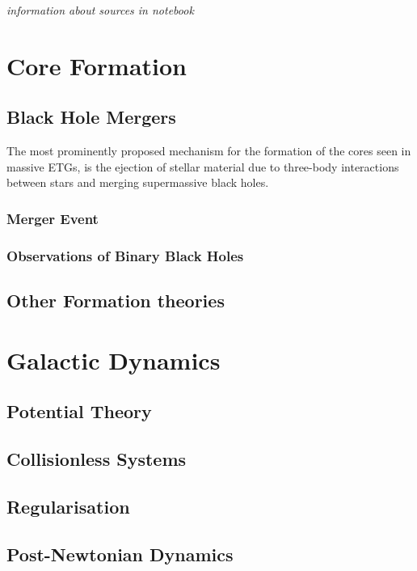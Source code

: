 \documentclass[english, oneside]{HYgradu}
\begin{document}
\textit{information about sources in notebook}

\section{Core Formation}

\subsection{Black Hole Mergers}

The most prominently proposed mechanism for the formation of the cores seen in massive ETGs, is the ejection of stellar material due to three-body interactions between stars and merging supermassive black holes.

\subsubsection{Merger Event}

\subsubsection{Observations of Binary Black Holes}

\subsection{Other Formation theories}

\section{Galactic Dynamics}

\subsection{Potential Theory}

\subsection{Collisionless Systems}

\subsection{Regularisation}

\subsection{Post-Newtonian Dynamics}
\end{document}
